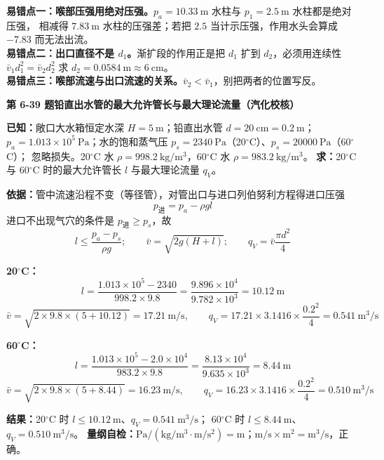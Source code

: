 \begin{yicuo}
\textbf{易错点一：喉部压强用绝对压强。}$p_a=10.33\ \mathrm{m}$ 水柱与 $p_1=2.5\ \mathrm{m}$ 水柱都是绝对压强，
相减得 $7.83\ \mathrm{m}$ 水柱的压强差；若把 $2.5$ 当计示压强，作用水头会算成 $-7.83$ 而无法出流。\\
\textbf{易错点二：出口直径不是 $d_1$。}渐扩段的作用正是把 $d_1$ 扩到 $d_2$，必须用连续性
$\bar v_1d_1^2=\bar v_2d_2^2$ 求 $d_2=0.0584\ \mathrm{m}\approx6\ \mathrm{cm}$。\\
\textbf{易错点三：喉部流速与出口流速的关系。}$\bar v_2<\bar v_1$，别把两者的位置写反。
\end{yicuo}

\noindent\textbf{第 6-39 题\quad 铅直出水管的最大允许管长与最大理论流量（汽化校核）}

\begin{jie}
\textbf{已知：}敞口大水箱恒定水深 $H=5\ \mathrm{m}$；铅直出水管 $d=20\ \mathrm{cm}=0.2\ \mathrm{m}$；
$p_a=1.013\times10^5\ \mathrm{Pa}$；水的饱和蒸气压 $p_s=2340\ \mathrm{Pa}$（20$^\circ$C）、$p_s=20000\ \mathrm{Pa}$（60$^\circ$C）；
忽略损失。20$^\circ$C 水 $\rho=998.2\ \mathrm{kg/m^3}$，60$^\circ$C 水 $\rho=983.2\ \mathrm{kg/m^3}$。
\textbf{求：}20$^\circ$C 与 60$^\circ$C 时的最大允许管长 $l$ 与最大理论流量 $q_V$。

\textbf{依据：}管中流速沿程不变（等径管），对管出口与进口列伯努利方程得进口压强
\[ p_{\text{进}}=p_a-\rho gl \]
进口不出现气穴的条件是 $p_{\text{进}}\ge p_s$，故
\[ l\le\frac{p_a-p_s}{\rho g};\qquad
\bar v=\sqrt{2g(H+l)};\qquad q_V=\bar v\frac{\pi d^2}{4} \]

\textbf{20$^\circ$C：}
\[ l=\frac{1.013\times10^5-2340}{998.2\times9.8}=\frac{9.896\times10^4}{9.782\times10^3}=10.12\ \mathrm{m} \]
\[ \bar v=\sqrt{2\times9.8\times(5+10.12)}=17.21\ \mathrm{m/s},\qquad
q_V=17.21\times3.1416\times\frac{0.2^2}{4}=0.541\ \mathrm{m^3/s} \]

\textbf{60$^\circ$C：}
\[ l=\frac{1.013\times10^5-2.0\times10^4}{983.2\times9.8}=\frac{8.13\times10^4}{9.635\times10^3}=8.44\ \mathrm{m} \]
\[ \bar v=\sqrt{2\times9.8\times(5+8.44)}=16.23\ \mathrm{m/s},\qquad
q_V=16.23\times3.1416\times\frac{0.2^2}{4}=0.510\ \mathrm{m^3/s} \]

\textbf{结果：}20$^\circ$C 时 $l\le10.12\ \mathrm{m}$、$q_V=0.541\ \mathrm{m^3/s}$；
60$^\circ$C 时 $l\le8.44\ \mathrm{m}$、$q_V=0.510\ \mathrm{m^3/s}$。
\textbf{量纲自检：}$\mathrm{Pa/(kg/m^3\cdot m/s^2)}=\mathrm{m}$；$\mathrm{m/s\times m^2}=\mathrm{m^3/s}$，正确。
\end{jie}

